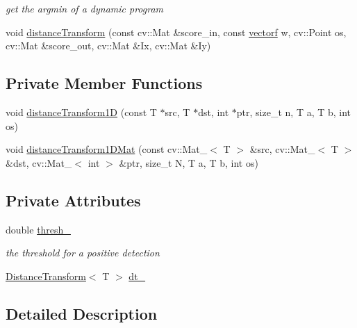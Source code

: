 \begin{DoxyCompactItemize}
\begin{DoxyCompactList}\small\item\em get the argmin of a dynamic program \end{DoxyCompactList}\item 
void \hyperlink{classDynamicProgram_a9de6aa6cd756dee7e9c060b354c59f73}{distance\-Transform} (const cv\-::\-Mat \&score\-\_\-in, const \hyperlink{types_8hpp_a4da5db3ee9e284f719ef5764dbadffc8}{vectorf} w, cv\-::\-Point os, cv\-::\-Mat \&score\-\_\-out, cv\-::\-Mat \&\-Ix, cv\-::\-Mat \&\-Iy)
\end{DoxyCompactItemize}
\subsection*{\-Private \-Member \-Functions}
\begin{DoxyCompactItemize}
\item 
void \hyperlink{classDynamicProgram_a5562f59b6e660b46709fdced37072613}{distance\-Transform1\-D} (const \-T $\ast$src, \-T $\ast$dst, int $\ast$ptr, size\-\_\-t n, \-T a, \-T b, int os)
\item 
void \hyperlink{classDynamicProgram_a4e50c2ce46bfd44072968b760f61f9c8}{distance\-Transform1\-D\-Mat} (const cv\-::\-Mat\-\_\-$<$ \-T $>$ \&src, cv\-::\-Mat\-\_\-$<$ \-T $>$ \&dst, cv\-::\-Mat\-\_\-$<$ int $>$ \&ptr, size\-\_\-t \-N, \-T a, \-T b, int os)
\end{DoxyCompactItemize}
\subsection*{\-Private \-Attributes}
\begin{DoxyCompactItemize}
\item 
double \hyperlink{classDynamicProgram_a08f2d4801faa0f964e217b9ac9927ec6}{thresh\-\_\-}
\begin{DoxyCompactList}\small\item\em the threshold for a positive detection \end{DoxyCompactList}\item 
\hyperlink{classDistanceTransform}{\-Distance\-Transform}$<$ \-T $>$ \hyperlink{classDynamicProgram_a6cea0b8559d6a03d81e2003991ab67cf}{dt\-\_\-}
\end{DoxyCompactItemize}


\subsection{\-Detailed \-Description}
